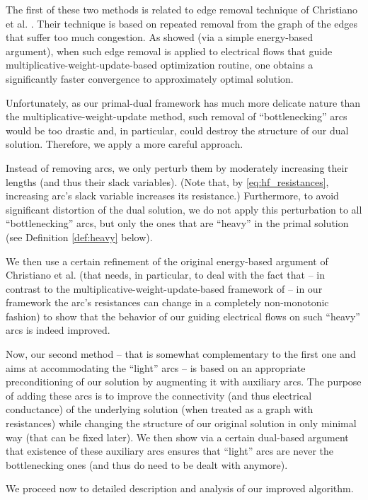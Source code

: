 \documentclass[11pt, letterpaper]{article}
\begin{document}
The first of these two methods is related to edge removal technique of Christiano et al. \cite{ChristianoKMST11}. Their technique is based on repeated removal from the graph of the edges that suffer too much congestion. As \cite{ChristianoKMST11} showed (via a simple energy-based argument), when such edge removal is applied to electrical flows that guide multiplicative-weight-update-based optimization routine, one obtains a significantly faster convergence to approximately optimal solution.

Unfortunately, as our primal-dual framework has much more delicate nature than the multiplicative-weight-update method, such removal of ``bottlenecking'' arcs would be too drastic and, in particular, could destroy the structure of our dual solution. Therefore, we apply a more careful approach. 

Instead of removing arcs, we only perturb them by moderately increasing their lengths (and thus their slack variables). (Note that, by \eqref{eq:hf_resistances}, increasing arc's slack variable increases its resistance.) Furthermore, to avoid significant distortion of the dual solution, we do not apply this perturbation to all ``bottlenecking'' arcs, but only the ones that are ``heavy'' in the primal solution (see Definition \ref{def:heavy} below). 

We then use a certain refinement of the original energy-based argument of Christiano et al. \cite{ChristianoKMST11} (that needs, in particular, to deal with the fact that -- in contrast to the multiplicative-weight-update-based framework of \cite{ChristianoKMST11} -- in our framework the arc's resistances can change in a completely non-monotonic fashion) to show that the behavior of our guiding electrical flows on such ``heavy'' arcs is indeed improved. 

Now, our second method -- that is somewhat complementary to the first one and aims at accommodating the ``light'' arcs -- is based on an appropriate preconditioning of our solution by augmenting it with auxiliary arcs. The purpose of adding these arcs is to improve the connectivity (and thus electrical conductance) of the underlying solution (when treated as a graph with resistances) while changing the structure of our original solution in only minimal way (that can be fixed later). We then show via a certain dual-based argument that existence of these auxiliary arcs ensures that ``light'' arcs are never the bottlenecking ones (and thus do need to be dealt with anymore). 

We proceed now to detailed description and analysis of our improved algorithm.
\end{document}
